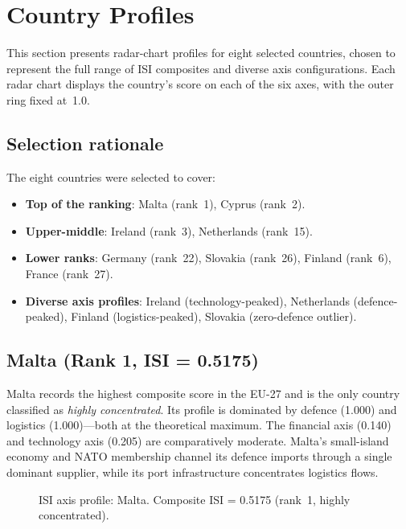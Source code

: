 \section{Country Profiles}\label{sec:country-profiles}

This section presents radar-chart profiles for eight selected
countries, chosen to represent the full range of ISI composites
and diverse axis configurations.  Each radar chart displays the
country's score on each of the six axes, with the outer ring fixed
at~1.0.

\subsection{Selection rationale}

The eight countries were selected to cover:
\begin{itemize}[leftmargin=2em]
  \item \textbf{Top of the ranking}: Malta (rank~1), Cyprus (rank~2).
  \item \textbf{Upper-middle}: Ireland (rank~3), Netherlands (rank~15).
  \item \textbf{Lower ranks}: Germany (rank~22), Slovakia (rank~26),
    Finland (rank~6), France (rank~27).
  \item \textbf{Diverse axis profiles}: Ireland (technology-peaked),
    Netherlands (defence-peaked), Finland (logistics-peaked), Slovakia
    (zero-defence outlier).
\end{itemize}

\subsection{Malta (Rank 1, ISI = 0.5175)}

Malta records the highest composite score in the EU-27 and is the
only country classified as \emph{highly concentrated}.  Its profile
is dominated by defence (1.000) and logistics (1.000)---both at the
theoretical maximum.  The financial axis (0.140) and technology axis
(0.205) are comparatively moderate.  Malta's small-island economy
and NATO membership channel its defence imports through a single
dominant supplier, while its port infrastructure concentrates
logistics flows.

\begin{figure}[htbp]
\centering

\caption{ISI axis profile: Malta.  Composite ISI = 0.5175 (rank~1,
  highly concentrated).}
\label{fig:radar-MT}
\end{figure}

